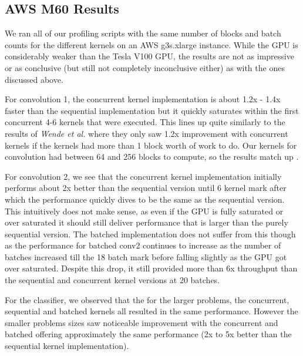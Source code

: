\documentclass[sigconf]{acmart}
\begin{document}
\subsection{AWS M60 Results}
We ran all of our profiling scripts with the same number of blocks and batch counts for the different kernels on an AWS g3s.xlarge instance. While the GPU is considerably weaker than the Tesla V100 GPU, the results are not as impressive or as conclusive (but still not completely inconclusive either) as with the ones discussed above. 
  
For convolution 1, the concurrent kernel implementation is about 1.2x - 1.4x faster than the sequential implementation but it quickly saturates within the first concurrent 4-6 kernels that were executed. This lines up quite similarly to the results of \textit{Wende et al.} where they only saw 1.2x improvement with concurrent kernels if the kernels had more than 1 block worth of work to do. Our kernels for convolution had between 64 and 256 blocks to compute, so the results match up \cite{wende_cordes_steinke_2012}. 
  
For convolution 2, we see that the concurrent kernel implementation initially performs about 2x better than the sequential version until 6 kernel mark after which the performance quickly dives to be the same as the sequential version. This intuitively does not make sense, as even if the GPU is fully saturated or over saturated it should still deliver performance that is larger than the purely sequential version. The batched implementation does not suffer from this though as the performance for batched conv2 continues to increase as the number of batches increased till the 18 batch mark before falling slightly as the GPU got over saturated. Despite this drop, it still provided more than 6x throughput than the sequential and concurrent kernel versions at 20 batches.
  
For the classifier, we observed that the for the larger problems, the concurrent, sequential and batched kernels all resulted in the same performance. However the smaller problems sizes saw noticeable improvement with the concurrent and batched offering approximately the same performance (2x to 5x better than the sequential kernel implementation).
\end{document}
